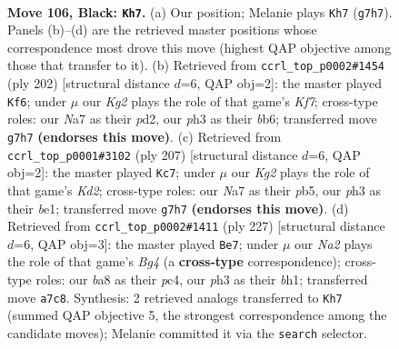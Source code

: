 \documentclass[11pt]{article}
\begin{document}
\clearpage

\begin{figure}[p]\centering
\begin{subfigure}{0.46\textwidth}\centering
\resizebox{\linewidth}{!}{%
\newchessgame
\chessboard[
  setfen={B7/n5k1/8/6PK/8/7P/2P5/8 b - - 1 106},
  showmover=false,
  pgfstyle=straightmove, color=movearrow, markmove={g7-h7}
]}
\caption{}
\end{subfigure}\hfill
\begin{subfigure}{0.46\textwidth}\centering
\resizebox{\linewidth}{!}{%
\newchessgame
\chessboard[
  setfen={8/5K2/1b5k/6p1/8/5B2/3p4/8 w - - 76 102},
  showmover=false,
  pgfstyle=straightmove, color=movearrow, markmove={f7-f6}
]}
\caption{}
\end{subfigure}
\\[4pt]
\begin{subfigure}{0.46\textwidth}\centering
\resizebox{\linewidth}{!}{%
\newchessgame
\chessboard[
  setfen={8/3k4/8/1PP5/3K4/8/8/4B2b b - - 84 104},
  showmover=false,
  pgfstyle=straightmove, color=movearrow, markmove={d7-c7}
]}
\caption{}
\end{subfigure}\hfill
\begin{subfigure}{0.46\textwidth}\centering
\resizebox{\linewidth}{!}{%
\newchessgame
\chessboard[
  setfen={8/8/1k6/6b1/KPP5/8/8/7B b - - 68 114},
  showmover=false,
  pgfstyle=straightmove, color=movearrow, markmove={g5-e7}
]}
\caption{}
\end{subfigure}
\caption{\textbf{Move 106, Black: \texttt{Kh7}.} (a) Our position; Melanie plays \texttt{Kh7} (\texttt{g7h7}). Panels (b)--(d) are the retrieved master positions whose correspondence most drove this move (highest QAP objective among those that transfer to it). (b) Retrieved from \texttt{ccrl\_top\_p0002\#1454} (ply 202) [structural distance $d$=6, QAP obj=2]: the master played \texttt{Kf6}; under $\mu$ our \emph{Kg2} plays the role of that game's \emph{Kf7}; cross-type roles: our \emph{N}a7 as their \emph{p}d2, our \emph{p}h3 as their \emph{b}b6; transferred move \texttt{g7h7} \textbf{(endorses this move)}. (c) Retrieved from \texttt{ccrl\_top\_p0001\#3102} (ply 207) [structural distance $d$=6, QAP obj=2]: the master played \texttt{Kc7}; under $\mu$ our \emph{Kg2} plays the role of that game's \emph{Kd2}; cross-type roles: our \emph{N}a7 as their \emph{p}b5, our \emph{p}h3 as their \emph{b}e1; transferred move \texttt{g7h7} \textbf{(endorses this move)}. (d) Retrieved from \texttt{ccrl\_top\_p0002\#1411} (ply 227) [structural distance $d$=6, QAP obj=3]: the master played \texttt{Be7}; under $\mu$ our \emph{Na2} plays the role of that game's \emph{Bg4} (a \textbf{cross-type} correspondence); cross-type roles: our \emph{b}a8 as their \emph{p}c4, our \emph{p}h3 as their \emph{b}h1; transferred move \texttt{a7c8}. Synthesis: 2 retrieved analogs transferred to \texttt{Kh7} (summed QAP objective 5, the strongest correspondence among the candidate moves); Melanie committed it via the \texttt{search} selector.}
\label{fig:thought-m211}
\end{figure}
\end{document}
